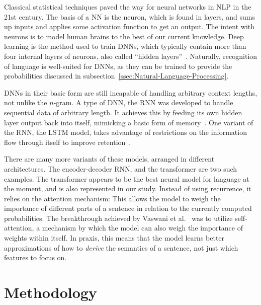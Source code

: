 \documentclass[conference]{IEEEtran}
\begin{document}
Classical statistical techniques paved the way for neural networks in \ac{NLP} in the 21st
century. The basis of a \ac{NN} is the neuron, which is found in layers, and sums up
inputs and applies some activation function to get an output. The intent with neurons is
to model human brains to the best of our current knowledge. Deep learning is the method
used to train \acp{DNN}, which typically contain more than four internal layers of
neurons, also called ``hidden layers''~\cite{Sze2017DNNs}. Naturally, recognition of
language is well-suited for \acp{DNN}, as they can be trained to provide the probabilities
discussed in subsection~\ref{ssec:Natural-Language-Processing}.

\acp{DNN} in their basic form are still incapable of handling arbitrary context lengths,
not unlike the $n$-gram. A type of \ac{DNN}, the \ac{RNN} was developed to handle
sequential data of arbitrary length. It achieves this by feeding its own hidden layer
output back into itself, mimicking a basic form of memory~\cite{Gao2019IdentGen}. One
variant of the \ac{RNN}, the \ac{LSTM} model, takes advantage of restrictions on the
information flow through itself to improve retention~\cite{Hochreiter97LSTM}.

There are many more variants of these models, arranged in different architectures. The
encoder-decoder \ac{RNN}, and the transformer are two such examples. The transformer
appears to be the best neural model for language at the moment, and is also represented in
our study. Instead of using recurrence, it relies on the attention mechanism: This allows
the model to weigh the importance of different parts of a sentence in relation to the
currently computed probabilities. The breakthrough achieved by Vaswani et
al.\@~\cite{Vaswani2017Transformer} was to utilize self-attention, a mechanism by which
the model can also weigh the importance of weights within itself. In praxis, this means
that the model learns better approximations of how to \emph{derive} the semantics of a
sentence, not just which features to focus on.



\section{Methodology}
\label{sec:Methodology}
\end{document}
